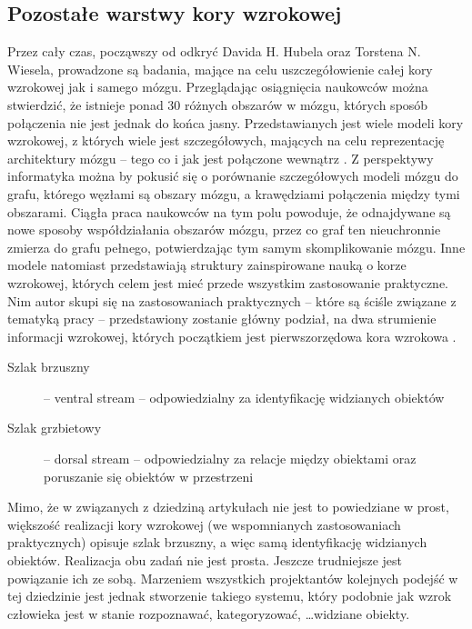 \subsection{Pozostałe warstwy kory wzrokowej}
\label{restOfTheVisualLayers}
Przez cały czas, począwszy od odkryć Davida H. Hubela oraz Torstena N. Wiesela, prowadzone są badania, mające na celu uszczegółowienie całej kory wzrokowej jak i samego mózgu. Przeglądając osiągnięcia naukowców można stwierdzić, że istnieje ponad 30 różnych obszarów w mózgu, których sposób połączenia nie jest jednak do końca jasny. Przedstawianych jest wiele modeli kory wzrokowej, z których wiele jest szczegółowych, mających na celu reprezentację architektury mózgu -- tego co i jak jest połączone wewnątrz \cite{Ungerleider}. Z perspektywy informatyka można by pokusić się o porównanie szczegółowych modeli mózgu do grafu, którego węzłami są obszary mózgu, a krawędziami połączenia między tymi obszarami. Ciągła praca naukowców na tym polu powoduje, że odnajdywane są nowe sposoby współdziałania obszarów mózgu, przez co graf ten nieuchronnie zmierza do grafu pełnego, potwierdzając tym samym skomplikowanie mózgu. Inne modele natomiast przedstawiają struktury zainspirowane nauką o korze wzrokowej, których celem jest mieć przede wszystkim zastosowanie praktyczne.\\

Nim autor skupi się na zastosowaniach praktycznych -- które są ściśle związane z tematyką pracy -- przedstawiony zostanie główny podział, na dwa strumienie informacji wzrokowej, których początkiem jest pierwszorzędowa kora wzrokowa \cite{Ungerleider}.\\
\begin{description}
\item [Szlak brzuszny] -- ventral stream -- odpowiedzialny za identyfikację widzianych obiektów
\item [Szlak grzbietowy] -- dorsal stream -- odpowiedzialny za relacje między obiektami oraz poruszanie się obiektów w przestrzeni
\end{description}


Mimo, że w związanych z dziedziną artykułach nie jest to powiedziane w prost, większość realizacji kory wzrokowej (we wspomnianych zastosowaniach praktycznych) opisuje szlak brzuszny, a więc samą identyfikację widzianych obiektów. Realizacja obu zadań nie jest prosta. Jeszcze trudniejsze jest powiązanie ich ze sobą. Marzeniem wszystkich projektantów kolejnych podejść w tej dziedzinie jest jednak stworzenie takiego systemu, który podobnie jak wzrok człowieka jest w stanie rozpoznawać, kategoryzować, \ldots widziane obiekty.\\

